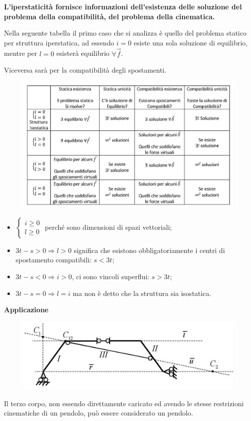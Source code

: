 \documentclass{article}
\begin{document}
\begin{adjustwidth}{2in}{}
 \textbf{L'iperstaticità fornisce informazioni dell'esistenza delle soluzione del problema della compatibilità, del problema della cinematica.}  \newline 
 
 Nella seguente tabella il primo caso che si analizza è quello del problema statico per struttura iperstatica, ad essendo $i=0$ esiste una sola soluzione di equilibrio, mentre per $l=0$ esisterà equilibrio $\forall\vec{f}$.
 
 Viceversa sarà per la compatibilità degli spostamenti.
 
\begin{figure}[H]
	\centering
	\includegraphics[width=0.8\linewidth]{immagini/tab}
\end{figure}

\begin{itemize}
	\item $ \begin{cases}
		i \geq 0 \\
		l \geq 0
	\end{cases}$ perché sono dimensioni di spazi vettoriali;
\item $ 3t-s>0 \Rightarrow l>0$ significa che esistono obbligatoriamente i centri di spostamento compatibili: $s<3t$;
\item   $ 3t-s<0 \Rightarrow i>0$, ci sono vincoli superflui: $s>3t$;
\item   $ 3t-s=0 \Rightarrow l=i$ ma non è detto che la struttura sia isostatica.
\end{itemize}

\newpage

\textbf{{\Large Applicazione} }
\begin{figure}[H]
	\centering
	\includegraphics[width=0.55\linewidth]{immagini/1.PARTE4_Pagina_14}
\end{figure}
Il terzo corpo, non essendo
direttamente caricato ed
avendo le stesse restrizioni
cinematiche di un pendolo, può
essere considerato un pendolo.


\end{adjustwidth}
\end{document}
